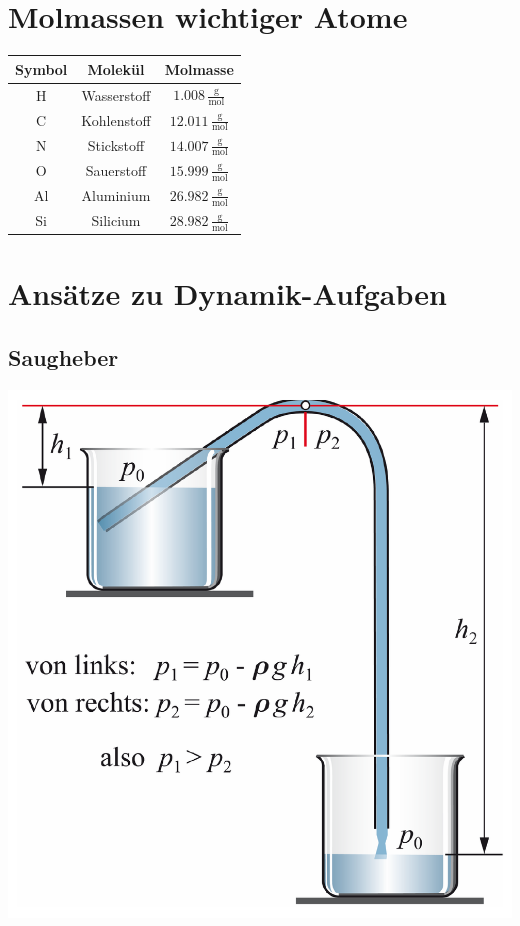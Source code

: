 \section{Molmassen wichtiger Atome}

\begin{tabular}{c | c | c }
\textbf{Symbol} & \textbf{Molekül} & \textbf{Molmasse} \\
\hline
\rule{0pt}{10pt} H & Wasserstoff & $1.008 \, \mathrm{\frac{g}{mol}}$ \\
\rule{0pt}{10pt} C & Kohlenstoff & $12.011 \, \mathrm{\frac{g}{mol}}$ \\
\rule{0pt}{10pt} N & Stickstoff & $14.007 \, \mathrm{\frac{g}{mol}}$ \\
\rule{0pt}{10pt} O & Sauerstoff & $15.999 \, \mathrm{\frac{g}{mol}}$ \\
\rule{0pt}{10pt} Al & Aluminium & $26.982 \, \mathrm{\frac{g}{mol}}$ \\
\rule{0pt}{10pt} Si & Silicium & $28.982 \, \mathrm{\frac{g}{mol}}$ \\
\end{tabular}




\section{Ansätze zu Dynamik-Aufgaben}

\subsection{Saugheber}
\includegraphics[width=.65\linewidth]{Bilder/saugheber.png}

